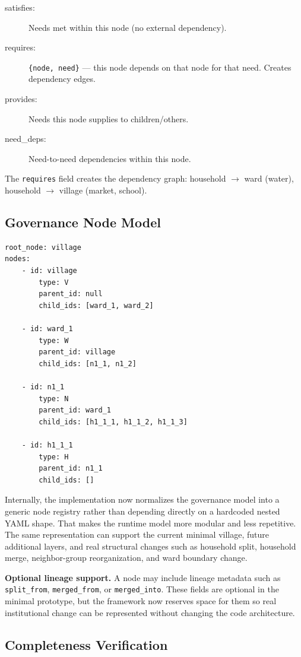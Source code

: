 \documentclass[11pt,a4paper]{article}
\begin{document}
\begin{description}
    \item[satisfies:] Needs met within this node (no external dependency).
    \item[requires:] \texttt{\{node, need\}} --- this node depends on that node for that need. Creates dependency edges.
    \item[provides:] Needs this node supplies to children/others.
    \item[need\_deps:] Need-to-need dependencies within this node.
\end{description}

The \texttt{requires} field creates the dependency graph: household $\rightarrow$ ward (water), household $\rightarrow$ village (market, school).

\subsection{Governance Node Model}

\begin{verbatim}
root_node: village
nodes:
    - id: village
        type: V
        parent_id: null
        child_ids: [ward_1, ward_2]

    - id: ward_1
        type: W
        parent_id: village
        child_ids: [n1_1, n1_2]

    - id: n1_1
        type: N
        parent_id: ward_1
        child_ids: [h1_1_1, h1_1_2, h1_1_3]

    - id: h1_1_1
        type: H
        parent_id: n1_1
        child_ids: []
\end{verbatim}

Internally, the implementation now normalizes the governance model into a generic node registry rather than depending directly on a hardcoded nested YAML shape. That makes the runtime model more modular and less repetitive. The same representation can support the current minimal village, future additional layers, and real structural changes such as household split, household merge, neighbor-group reorganization, and ward boundary change.

\textbf{Optional lineage support.} A node may include lineage metadata such as \texttt{split\_from}, \texttt{merged\_from}, or \texttt{merged\_into}. These fields are optional in the minimal prototype, but the framework now reserves space for them so real institutional change can be represented without changing the code architecture.

\subsection{Completeness Verification}
\end{document}
